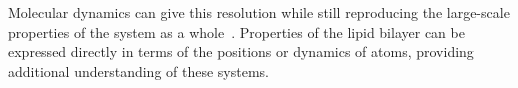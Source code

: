\documentclass[12pt,openany,final]{book}
\begin{document}
Molecular dynamics can give this resolution while still reproducing the large-scale properties of the system as a whole~\cite{pandit:2008:simulationtextbook,dror:2012:biomicroscope}. 
Properties of the lipid bilayer can be expressed directly in terms of the positions or dynamics of atoms, 
providing additional understanding of these systems.

%
\end{document}
